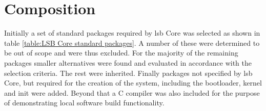 \section{Composition}\label{Composition}

Initially a set of standard packages required by \gls{lsb} Core was selected as shown in table \ref{table:LSB Core standard packages}. A number of these were determined to be out of scope and were thus excluded. For the majority of the remaining packages smaller alternatives were found and evaluated in accordance with the selection criteria. The rest were inherited. Finally packages not specified by \gls{lsb} Core, but required for the creation of the system, including the bootloader, kernel and init were added. Beyond that a C compiler was also included for the purpose of demonstrating local software build functionality.

\newpage

\newpage

\newpage

